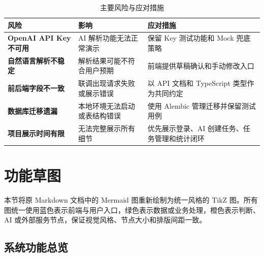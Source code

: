 \documentclass[UTF8,a4paper,12pt,fontset=fandol]{ctexart}
\begin{document}
\begin{table}[H]
  \centering
  \caption{主要风险与应对措施}
  \begin{tabularx}{\linewidth}{>{\bfseries}p{3.1cm}YY}
    \toprule
    风险 & 影响 & 应对措施 \\
    \midrule
    OpenAI API Key 不可用 & AI 解析功能无法正常演示 & 保留 Key 测试功能和 Mock 兜底策略 \\
    自然语言解析不稳定 & 解析结果可能不符合用户预期 & 前端提供草稿确认和手动修改入口 \\
    前后端字段不一致 & 联调出现请求失败或展示错误 & 以 API 文档和 TypeScript 类型作为共同约定 \\
    数据库迁移遗漏 & 本地环境无法启动或表结构错误 & 使用 Alembic 管理迁移并保留测试用例 \\
    项目展示时间有限 & 无法完整展示所有细节 & 优先展示登录、AI 创建任务、任务管理和统计闭环 \\
    \bottomrule
  \end{tabularx}
\end{table}

\section{功能草图}

本节将原 Markdown 文档中的 Mermaid 图重新绘制为统一风格的 TikZ 图。所有图统一使用蓝色表示前端与用户入口，绿色表示数据或业务处理，橙色表示判断、AI 或外部服务节点，保证视觉风格、节点大小和排版间距一致。

\subsection{系统功能总览}
\end{document}
